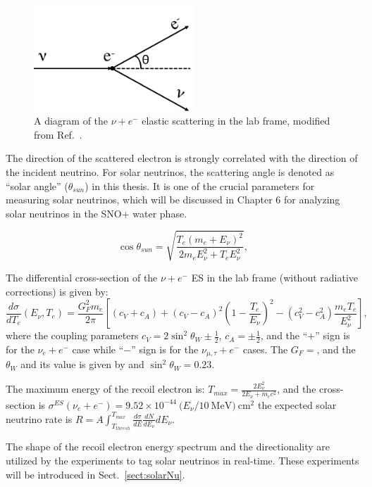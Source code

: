 \begin{figure}[htbp]
	\centering	
	\includegraphics[width=6cm]{ElasticScatteringCartoon.png}
	\caption{A diagram of the $\nu + e^-$ elastic scattering in the lab frame, modified from Ref.~\cite{giunti2007fundamentals}.	\label{fig:ESdiagram}}
\end{figure}

The direction of the scattered electron is strongly correlated with the direction of the incident neutrino. For solar neutrinos, the scattering angle is denoted as ``solar angle'' ($\theta_{sun}$) in this thesis. It is one of the crucial parameters for measuring solar neutrinos, which will be discussed in Chapter 6 for analyzing solar neutrinos in the SNO+ water phase.

\begin{equation}\label{eq:costhetaSun}
\cos\theta_{sun}=\sqrt{\frac{T_e(m_e+E_\nu)^2}{2m_eE_\nu^2+T_eE_\nu^2}},
\end{equation}

The differential cross-section of the $\nu+e^-$ ES in the lab frame (without radiative corrections) is given by\cite{suzuki2020sun,xing2011neutrinos,giunti2007fundamentals}:
\begin{equation}
\frac{d\sigma}{dT_e}(E_\nu,T_e)=\frac{G_F^2m_e}{2\pi}\left[(c_V+c_A)+(c_V-c_A)^2\left(1-\frac{T_e}{E_\nu}\right)^2-(c_V^2-c_A^2)\frac{m_eT_e}{E_\nu^2}\right],
\end{equation}
where the coupling parameters $c_V=2\sin^2\theta_W\pm\frac{1}{2}$, $c_A=\pm\frac{1}{2}$, and the ``$+$'' sign is for the $\nu_e+e^-$ case while ``$-$'' sign is for the $\nu_{\mu,\tau}+e^-$ cases. The $G_F=$, and the $\theta_W$
and its value is given by and $\sin^2\theta_W=0.23$.

The maximum energy of the recoil electron is: $T_{max}=\frac{2E^2_\nu}{2E_\nu+m_e c^2}$, and
the cross-section is $\sigma^{ES}(\nu_e +e^-)=9.52\times 10^{-44}~(E_\nu/10~\mathrm{MeV)~cm^2}$
the expected solar neutrino rate is 
$R=A\int_{T_{thresh}}^{T_{max}}\frac{d\sigma}{dE}\frac{dN}{dE_\nu}dE_\nu$.
 
The shape of the recoil electron energy spectrum and the directionality are utilized by the experiments to tag solar neutrinos in real-time\cite{suzuki2020sun}. These experiments will be introduced in Sect.~\ref{sect:solarNu}.

